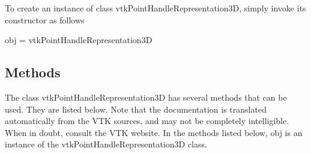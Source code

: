 To create an instance of class vtk\-Point\-Handle\-Representation3\-D, simply invoke its constructor as follows \begin{DoxyVerb}  obj = vtkPointHandleRepresentation3D
\end{DoxyVerb}
 \hypertarget{vtkwidgets_vtkxyplotwidget_Methods}{}\subsection{Methods}\label{vtkwidgets_vtkxyplotwidget_Methods}
The class vtk\-Point\-Handle\-Representation3\-D has several methods that can be used. They are listed below. Note that the documentation is translated automatically from the V\-T\-K sources, and may not be completely intelligible. When in doubt, consult the V\-T\-K website. In the methods listed below, {\ttfamily obj} is an instance of the vtk\-Point\-Handle\-Representation3\-D class. 
